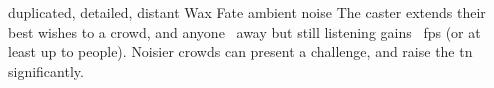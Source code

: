   {duplicated, detailed, distant}%
  {Wax}%
  {Fate}%
  {ambient noise}%
  {The caster extends their best wishes to a crowd, and anyone \spellRange\ away but still listening gains ~\glspl{fp} (or at least up to  people).}%
  {Noisier crowds can present a challenge, and raise the \gls{tn} significantly.}
